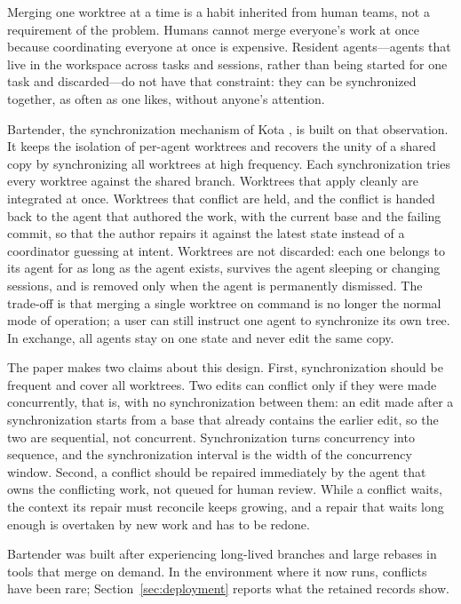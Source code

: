 \documentclass[pdflatex,sn-mathphys-ay]{sn-jnl}
\theoremstyle{thmstyleone}
\theoremstyle{thmstylethree}
\begin{document}
Merging one worktree at a time is a habit inherited from human teams, not a requirement of the problem. Humans cannot merge everyone's work at once because coordinating everyone at once is expensive. Resident agents---agents that live in the workspace across tasks and sessions, rather than being started for one task and discarded---do not have that constraint: they can be synchronized together, as often as one likes, without anyone's attention.

Bartender, the synchronization mechanism of Kota \citep{kota-source,wu2026kotalongtermteammates}, is built on that observation. It keeps the isolation of per-agent worktrees and recovers the unity of a shared copy by synchronizing all worktrees at high frequency. Each synchronization tries every worktree against the shared branch. Worktrees that apply cleanly are integrated at once. Worktrees that conflict are held, and the conflict is handed back to the agent that authored the work, with the current base and the failing commit, so that the author repairs it against the latest state instead of a coordinator guessing at intent. Worktrees are not discarded: each one belongs to its agent for as long as the agent exists, survives the agent sleeping or changing sessions, and is removed only when the agent is permanently dismissed. The trade-off is that merging a single worktree on command is no longer the normal mode of operation; a user can still instruct one agent to synchronize its own tree. In exchange, all agents stay on one state and never edit the same copy.

The paper makes two claims about this design. First, synchronization should be frequent and cover all worktrees. Two edits can conflict only if they were made concurrently, that is, with no synchronization between them: an edit made after a synchronization starts from a base that already contains the earlier edit, so the two are sequential, not concurrent. Synchronization turns concurrency into sequence, and the synchronization interval is the width of the concurrency window. Second, a conflict should be repaired immediately by the agent that owns the conflicting work, not queued for human review. While a conflict waits, the context its repair must reconcile keeps growing, and a repair that waits long enough is overtaken by new work and has to be redone.

Bartender was built after experiencing long-lived branches and large rebases in tools that merge on demand. In the environment where it now runs, conflicts have been rare; Section~\ref{sec:deployment} reports what the retained records show.
\end{document}
